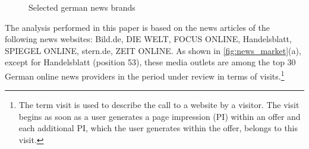 \documentclass[
]{article}
\begin{document}
\begin{figure}

{\centering {}

}

\caption{Selected german news brands \label{fig:news_market}}\label{fig:unnamed-chunk-1}
\end{figure}

The analysis performed in this paper is based on the news articles of
the following news websites: Bild.de, DIE WELT, FOCUS ONLINE,
Handelsblatt, SPIEGEL ONLINE, stern.de, ZEIT ONLINE. As shown in
\autoref{fig:news_market}(a), except for Handelsblatt (position 53),
these media outlets are among the top 30 German online news providers in
the period under review in terms of visits.\footnote{The term visit is
  used to describe the call to a website by a visitor. The visit begins
  as soon as a user generates a page impression (PI) within an offer and
  each additional PI, which the user generates within the offer, belongs
  to this visit.}
\end{document}
